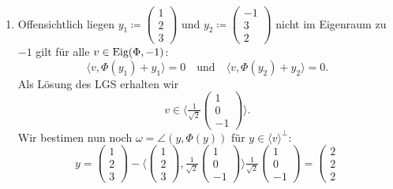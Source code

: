 \begin{enumerate}
	 \item Offensichtlich liegen \( y_1 \coloneqq \left( \begin{smallmatrix}
	 	1 \\ 2 \\ 3
	 \end{smallmatrix} \right) \) und \( y_2 \coloneqq \left( \begin{smallmatrix}
	 	-1 \\ 3 \\ 2
	 \end{smallmatrix} \right) \) nicht im Eigenraum zu \( -1 \) gilt für alle \( v \in \text{Eig}(\Phi, -1) \):
	 \begin{equation*}
	 	\langle v,\Phi(y_1)+y_1 \rangle = 0 \quad \text{und} \quad \langle v,\Phi(y_2)+y_2 \rangle = 0\text{.}
	 \end{equation*}
	 Als Lösung des LGS erhalten wir
	 \begin{equation*}
	 	v \in \langle \tfrac{1}{\sqrt{2}}\left( \begin{smallmatrix}
	 		1 \\ 0 \\ -1
	 	\end{smallmatrix} \right) \rangle\text{.}
	 \end{equation*}
	 Wir bestimen nun noch \( \omega = \angle(y,\Phi(y)) \) für \( y \in \langle v \rangle^\perp \):
	 \begin{equation*}
	 	y = \left( \begin{smallmatrix}
	 		1 \\ 2 \\ 3
	 	\end{smallmatrix} \right) - \langle \left( \begin{smallmatrix}
	 		1 \\ 2 \\ 3
	 	\end{smallmatrix} \right), \tfrac{1}{\sqrt{2}}\left( \begin{smallmatrix}
	 		1 \\ 0 \\ -1
	 	\end{smallmatrix} \right) \rangle \tfrac{1}{\sqrt{2}}\left( \begin{smallmatrix}
	 		1 \\ 0 \\ -1
	 	\end{smallmatrix} \right) = \left( \begin{smallmatrix}
	 		2 \\ 2 \\ 2

\end{smallmatrix}
\end{equation*}
\end{enumerate}

